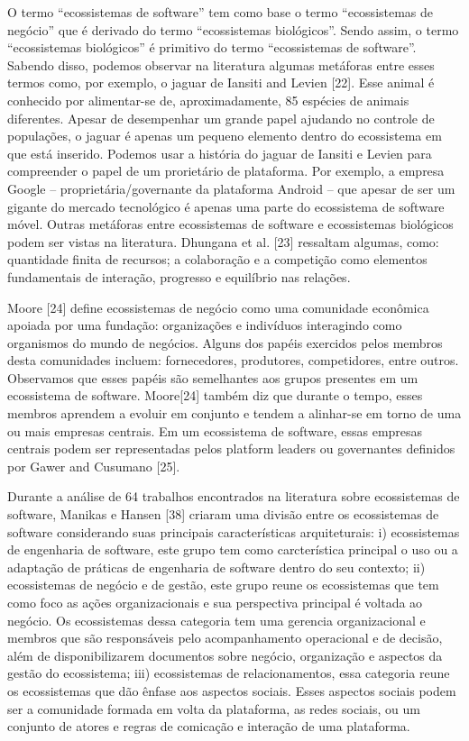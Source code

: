 \documentclass[conference]{IEEEtran}
\begin{document}
O termo “ecossistemas de software” tem como base o termo “ecossistemas de negócio” que é derivado do termo “ecossistemas biológicos”. Sendo assim, o termo “ecossistemas biológicos” é primitivo do termo “ecossistemas de software”. Sabendo disso, podemos observar na literatura algumas metáforas entre esses termos como, por exemplo, o jaguar de Iansiti and Levien [22]. Esse animal é conhecido por alimentar-se de, aproximadamente, 85 espécies de animais diferentes. Apesar de desempenhar um grande papel ajudando no controle de populações, o jaguar é apenas um pequeno elemento dentro do ecossistema em que está inserido. Podemos usar a história do jaguar de Iansiti e Levien para compreender o papel de um prorietário de plataforma. Por exemplo, a empresa Google -- proprietária/governante da plataforma Android -- que apesar de ser um gigante do mercado tecnológico é apenas uma parte do ecossistema de software móvel. Outras metáforas entre ecossistemas de software e ecossistemas biológicos podem ser vistas na literatura. Dhungana et al. [23] ressaltam algumas, como: quantidade finita de recursos; a colaboração e a competição como elementos fundamentais de interação, progresso e equilíbrio nas relações. 

Moore [24] define ecossistemas de negócio como uma comunidade econômica apoiada por uma fundação: organizações e indivíduos interagindo como organismos do mundo de negócios. Alguns dos papéis exercidos pelos membros desta comunidades incluem: fornecedores, produtores, competidores, entre outros. Observamos que esses papéis são semelhantes aos grupos presentes em um ecossistema de software. Moore[24] também diz que durante o tempo, esses membros aprendem a evoluir em conjunto e tendem a alinhar-se em torno de uma ou mais empresas centrais. Em um ecossistema de software, essas empresas centrais podem ser representadas pelos platform leaders ou governantes definidos por Gawer and Cusumano [25].

Durante a análise de 64 trabalhos encontrados na literatura sobre ecossistemas de software, Manikas e Hansen [38] criaram uma divisão entre os ecossistemas de software considerando suas principais características arquiteturais: i) ecossistemas de engenharia de software, este grupo tem como carcterística principal o uso ou a adaptação de práticas de engenharia de software dentro do seu contexto; ii) ecossistemas de negócio e de gestão, este grupo reune os ecossistemas que tem como foco as ações organizacionais e sua perspectiva principal é voltada ao negócio. Os ecossistemas dessa categoria tem uma gerencia organizacional e membros que são responsáveis pelo acompanhamento operacional e de decisão, além de disponibilizarem documentos sobre negócio, organização e aspectos da gestão do ecossistema; iii) ecossistemas de relacionamentos, essa categoria reune os ecossistemas que dão ênfase aos aspectos sociais. Esses aspectos sociais podem ser a comunidade formada em volta da plataforma, as redes sociais, ou um conjunto de atores e regras de comicação e interação de uma plataforma.
\end{document}
